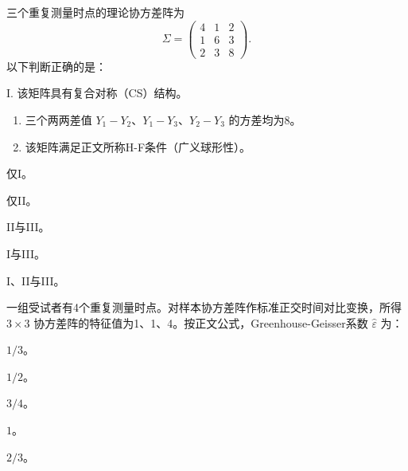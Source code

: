 \par\addvspace{6pt}\noindent\begin{minipage}{\linewidth}


三个重复测量时点的理论协方差阵为 \[\Sigma=\begin{pmatrix}4&1&2\\1&6&3\\2&3&8\end{pmatrix}.\] 以下判断正确的是：

I. 该矩阵具有复合对称（CS）结构。

\begin{enumerate}
\def\labelenumi{\Roman{enumi}.}
\setcounter{enumi}{1}
\item
  三个两两差值 \(Y_1-Y_2\)、\(Y_1-Y_3\)、\(Y_2-Y_3\) 的方差均为8。
\item
  该矩阵满足正文所称H-F条件（广义球形性）。
\end{enumerate}


\begin{choices}

\item 仅I。

\item 仅II。

\item II与III。

\item I与III。

\item I、II与III。

\end{choices}

\end{minipage}\par\vspace{4pt}

\par\addvspace{6pt}\noindent\begin{minipage}{\linewidth}


一组受试者有4个重复测量时点。对样本协方差阵作标准正交时间对比变换，所得 \(3\times3\) 协方差阵的特征值为1、1、4。按正文公式，Greenhouse-Geisser系数 \(\hat\varepsilon\) 为：


\begin{choices}

\item \(1/3\)。

\item \(1/2\)。

\item \(3/4\)。

\item \(1\)。

\item \(2/3\)。

\end{choices}

\end{minipage}\par\vspace{4pt}

